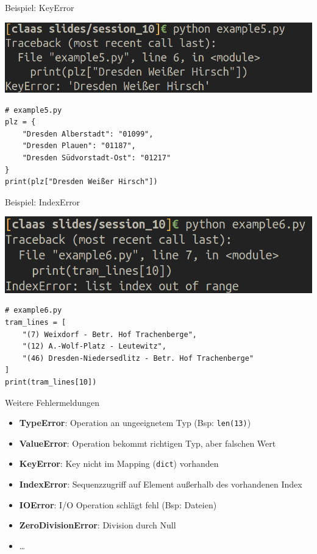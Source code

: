 \begin{frame}[fragile]{Beispiel: KeyError}
\begin{center}
    \includegraphics[width=\textwidth]{stack_trace_key_error.png}
\end{center}

\begin{lstlisting}
# example5.py
plz = {
    "Dresden Alberstadt": "01099",
    "Dresden Plauen": "01187",
    "Dresden Südvorstadt-Ost": "01217"
}
print(plz["Dresden Weißer Hirsch"])
\end{lstlisting}
\end{frame}

\begin{frame}[fragile]{Beispiel: IndexError}
\begin{center}
    \includegraphics[width=\textwidth]{stack_trace_index_error.png}
\end{center}

\begin{lstlisting}
# example6.py
tram_lines = [
    "(7) Weixdorf - Betr. Hof Trachenberge",
    "(12) A.-Wolf-Platz - Leutewitz",
    "(46) Dresden-Niedersedlitz - Betr. Hof Trachenberge"
]
print(tram_lines[10])
\end{lstlisting}
\end{frame}

\begin{frame}[fragile]{Weitere Fehlermeldungen}
    \begin{itemize}
        \item \textbf{TypeError}: Operation an ungeeignetem Typ (Bsp: \texttt{len(13)})
        \item \textbf{ValueError}: Operation bekommt richtigen Typ, aber falschen Wert
        \item \textbf{KeyError}: Key nicht im Mapping (\texttt{dict}) vorhanden
        \item \textbf{IndexError}: Sequenzzugriff auf Element außerhalb des vorhandenen Index
        \item \textbf{IOError}: I/O Operation schlägt fehl (Bsp: Dateien)
        \item \textbf{ZeroDivisionError}: Division durch Null
        \item \ldots
    \end{itemize}
\end{frame}

